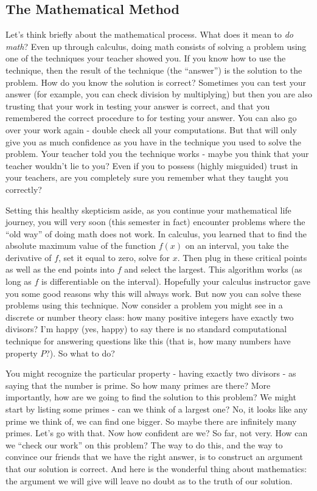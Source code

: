 


\subsection{The Mathematical Method}

Let's think briefly about the mathematical process.  What does it mean to {\em do math}?  Even up through calculus, doing math consists of solving a problem using one of the techniques your teacher showed you.  If you know how to use the technique, then the result of the technique (the ``answer'') is the solution to the problem.  How do you know the solution is correct?  Sometimes you can test your answer (for example, you can check division by multiplying) but then you are also trusting that your work in testing your answer is correct, and that you remembered the correct procedure to for testing your answer.  You can also go over your work again - double check all your computations.  But that will only give you as much confidence as you have in the technique you used to solve the problem.  Your teacher told you the technique works - maybe you think that your teacher wouldn't lie to you?  Even if you to possess (highly misguided) trust in your teachers, are you completely sure you remember what they taught you correctly?

Setting this healthy skepticism aside, as you continue your mathematical life journey, you will very soon (this semester in fact) encounter problems where the ``old way'' of doing math does not work.  In calculus, you learned that to find the absolute maximum value of the function $f(x)$ on an interval, you take the derivative of $f$, set it equal to zero, solve for $x$.  Then plug in these critical points as well as the end points into $f$ and select the largest.  This algorithm works (as long as $f$ is differentiable on the interval).  Hopefully your calculus instructor gave you some good reasons why this will always work.  But now you can solve these problems using this technique.  Now consider a problem you might see in a discrete or number theory class: how many positive integers have exactly two divisors?  I'm happy (yes, happy) to say there is no standard computational technique for answering questions like this (that is, how many numbers have property $P$?).  So what to do?

You might recognize the particular property - having exactly two divisors - as saying that the number is prime.  So how many primes are there?  More importantly, how are we going to find the solution to this problem?  We might start by listing some primes - can we think of a largest one?  No, it looks like any prime we think of, we can find one bigger.  So maybe there are infinitely many primes.  Let's go with that.  Now how confident are we?  So far, not very.  How can we ``check our work'' on this problem?  The way to do this, and the way to convince our friends that we have the right answer, is to construct an argument that our solution is correct.  And here is the wonderful thing about mathematics: the argument we will give will leave no doubt as to the truth of our solution.  

